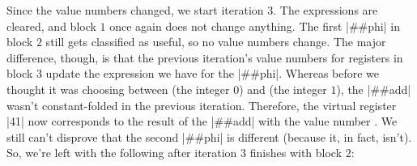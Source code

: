 Since the value numbers changed, we start iteration $3$.  The expressions are
cleared, and block $1$ once again does not change anything.  The first
\factor|##phi| in block $2$ still gets classified as useful, so no value
numbers change.  The major difference, though, is that the previous iteration's
value numbers for registers in block $3$ update the expression we have for the
\factor|##phi|.  Whereas before we thought it was choosing between  (the
integer $0$) and  (the integer $1$), the \factor|##add| wasn't
constant-folded in the previous iteration.  Therefore, the virtual register
\factor|41| now corresponds to the result of the \factor|##add| with the value
number .  We still can't disprove that the second \factor|##phi| is
different (because it, in fact, isn't).  So, we're left with the following
after iteration $3$ finishes with block $2$:
%
